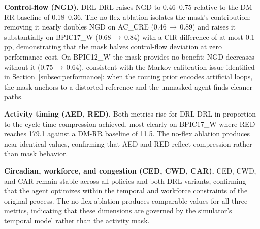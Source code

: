 \documentclass[journal,onecolumn]{IEEEtran}
\begin{document}
\begin{table}[!ht]
\caption[Similarity distances across policies]{Similarity distances: mean$^{\pm\text{95\% CI}}$ ($\downarrow$ better).
Best (lowest) value per (log, metric) pair underlined.
$^{\dagger}$DRL-DRL CTD on BPIC12\_W falls below DM-RR because
cycle-time compression narrows the distribution toward the
original's shape.}
\label{tab:similarity_drl}
\end{table}

\noindent\textbf{Control-flow (NGD).}
DRL-DRL raises NGD to 0.46--0.75 relative to the DM-RR baseline of
0.18--0.36. The no-flex ablation isolates the mask's contribution:
removing it nearly doubles NGD on AC\_CRE (0.46\,$\to$\,0.89) and
raises it substantially on BPIC17\_W (0.68\,$\to$\,0.84) with a
CIR difference of at most 0.1 pp, demonstrating that the mask halves
control-flow deviation at zero performance cost.
On BPIC12\_W the mask provides no benefit; NGD decreases without
it (0.75\,$\to$\,0.64), consistent with the Markov calibration
issue identified in Section~\ref{subsec:performance}: when the
routing prior encodes artificial loops, the mask anchors to a
distorted reference and the unmasked agent finds cleaner paths.

\noindent\textbf{Activity timing (AED, RED).}
Both metrics rise for DRL-DRL in proportion to the cycle-time
compression achieved, most clearly on BPIC17\_W where RED reaches
179.1 against a DM-RR baseline of 11.5. The no-flex ablation
produces near-identical values, confirming that AED and RED reflect
compression rather than mask behavior.

\noindent\textbf{Circadian, workforce, and congestion (CED, CWD, CAR).}
CED, CWD, and CAR remain stable across all policies and both DRL
variants, confirming that the agent optimizes within the temporal
and workforce constraints of the original process. The no-flex
ablation produces comparable values for all three metrics,
indicating that these dimensions are governed by the simulator's
temporal model rather than the activity mask.
\end{document}
